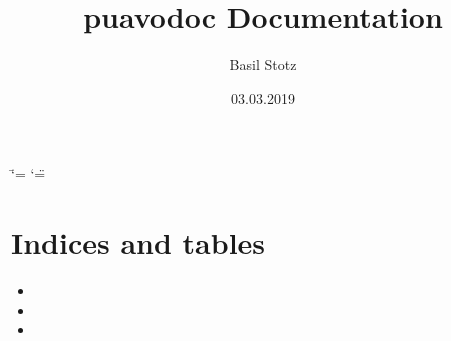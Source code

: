 \documentclass[letterpaper,10pt,ngerman]{sphinxmanual}
\title{puavodoc Documentation}
\date{03.03.2019}
\author{Basil Stotz}
\begin{document}
\ifdefined\shorthandoff
  \ifnum\catcode`\=\string=\active\shorthandoff{=}\fi
  \ifnum\catcode`\"=\active{}\fi
\fi

\pagestyle{empty}
\sphinxmaketitle
\pagestyle{plain}
\sphinxtableofcontents
\pagestyle{normal}
\label{\detokenize{index::doc}}



\chapter{Indices and tables}
\label{\detokenize{index:indices-and-tables}}\begin{itemize}
\item {} 

\item {} 

\item {} 

\end{itemize}



\renewcommand{\indexname}{Stichwortverzeichnis}
\printindex
\end{document}
